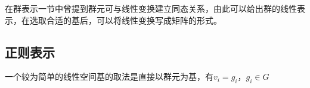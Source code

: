 \begin{issues}
\issueDraft
\end{issues}
在群表示一节中曾提到群元可与线性变换建立同态关系，由此可以给出群的线性表示，在选取合适的基后，可以将线性变换写成矩阵的形式。

\subsection{正则表示}

一个较为简单的线性空间基的取法是直接以群元为基，有$v_i=g_i$，$g_i \in G$

